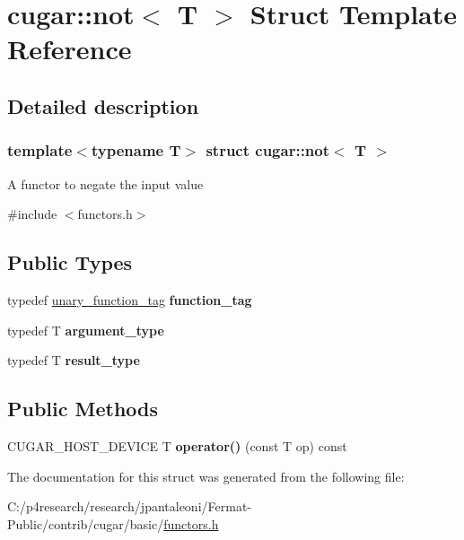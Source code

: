 \hypertarget{structcugar_1_1not}{}\section{cugar\+:\+:not$<$ T $>$ Struct Template Reference}
\label{structcugar_1_1not}


\subsection{Detailed description}
\subsubsection*{template$<$typename T$>$\newline
struct cugar\+::not$<$ T $>$}

A functor to negate the input value 

{\ttfamily \#include $<$functors.\+h$>$}

\subsection*{Public Types}
\begin{DoxyCompactItemize}
\item 
\mbox{\label{structcugar_1_1not_a09fec0e9d54821fc6356289218bcfc3f}} 
typedef \hyperlink{structcugar_1_1unary__function__tag}{unary\+\_\+function\+\_\+tag} {\bfseries function\+\_\+tag}
\item 
\mbox{\label{structcugar_1_1not_a94f84b0a8a1e08287c6c4ced8ae9acbc}} 
typedef T {\bfseries argument\+\_\+type}
\item 
\mbox{\label{structcugar_1_1not_a1e1d0a184fe56f9883d64f31370b88fb}} 
typedef T {\bfseries result\+\_\+type}
\end{DoxyCompactItemize}
\subsection*{Public Methods}
\begin{DoxyCompactItemize}
\item 
\mbox{\label{structcugar_1_1not_af399984c85bb4e390ec48992187d1dfc}} 
C\+U\+G\+A\+R\+\_\+\+H\+O\+S\+T\+\_\+\+D\+E\+V\+I\+CE T {\bfseries operator()} (const T op) const
\end{DoxyCompactItemize}


The documentation for this struct was generated from the following file\+:\begin{DoxyCompactItemize}
\item 
C\+:/p4research/research/jpantaleoni/\+Fermat-\/\+Public/contrib/cugar/basic/\hyperlink{functors_8h}{functors.\+h}\end{DoxyCompactItemize}
